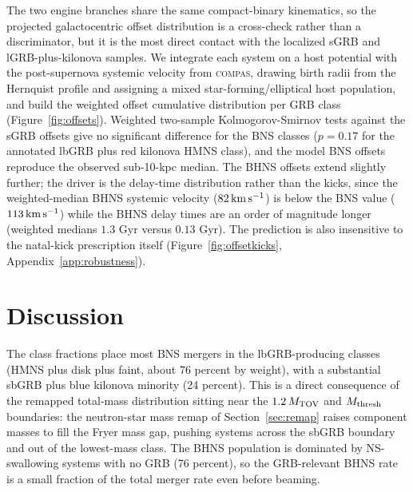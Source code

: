 \documentclass[twocolumn,amsmath]{aastex702}
\newcommand{\Mtov}{M_{\rm TOV}}
\newcommand{\Mthresh}{M_{\rm thresh}}
\newcommand{\compas}{\textsc{compas}}
\begin{document}
The two engine branches share the same compact-binary kinematics, so the
projected galactocentric offset distribution is a cross-check rather than a
discriminator, but it is the most direct contact with the localized sGRB and
lGRB-plus-kilonova samples. We integrate each system on a \citet{hernquist1990}
host potential with the post-supernova systemic velocity from \compas, drawing
birth radii from the Hernquist profile and assigning a mixed
star-forming/elliptical host population, and build the weighted offset
cumulative
distribution per GRB class (Figure~\ref{fig:offsets}). Weighted two-sample
Kolmogorov-Smirnov tests against the \citet{fong2013} sGRB offsets give no
significant difference for the BNS classes ($p = 0.17$ for the annotated lbGRB
plus red kilonova HMNS class), and the model BNS offsets reproduce the
observed sub-10-kpc median. The BHNS offsets extend slightly further; the
driver is the delay-time distribution rather than the kicks, since the
weighted-median BHNS systemic velocity ($82\,{\rm km\,s^{-1}}$) is below the
BNS value ($113\,{\rm km\,s^{-1}}$) while the BHNS delay times are an order of
magnitude longer (weighted medians $1.3$ Gyr versus $0.13$ Gyr). The
prediction is also insensitive to the natal-kick prescription itself
(Figure~\ref{fig:offsetkicks}, Appendix~\ref{app:robustness}).

\FloatBarrier
\section{Discussion} \label{sec:discussion}

The class fractions place most BNS mergers in the lbGRB-producing classes (HMNS
plus disk plus faint, about 76 percent by weight), with a substantial sbGRB plus
blue kilonova minority (24 percent). This is a direct consequence of the remapped
total-mass distribution sitting near the $1.2\,\Mtov$ and $\Mthresh$ boundaries:
the neutron-star mass remap of Section~\ref{sec:remap} raises component masses to
fill the Fryer mass gap, pushing systems across the sbGRB boundary and out of the
lowest-mass class. The BHNS population is dominated by NS-swallowing systems with
no GRB (76 percent), so the GRB-relevant BHNS rate is a small fraction of the
total merger rate even before beaming.
\end{document}
